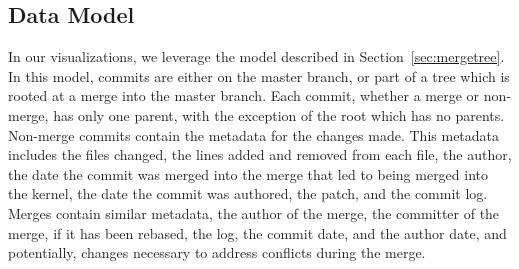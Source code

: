 \documentclass[AMA]{Wiley}
\begin{document}
\subsection{Data Model}

In our visualizations, we leverage the \mt model described in
Section~\ref{sec:mergetree}. In this model, commits are either on the
master branch, or part of a tree which is rooted at a merge into the
master branch. Each commit, whether a merge or non-merge, has only one
parent, with the exception of the root which has no parents. Non-merge
commits contain the metadata for the changes made. This metadata
includes the files changed, the lines added and removed from each file,
the author, the date the commit was merged into the merge that led to
being merged into the kernel, the date the commit was authored, the
patch, and the commit log. Merges contain similar metadata, the author
of the merge, the committer of the merge, if it has been rebased, the
log, the commit date, and the author date, and potentially, changes
necessary to address conflicts during the merge.










\end{document}
